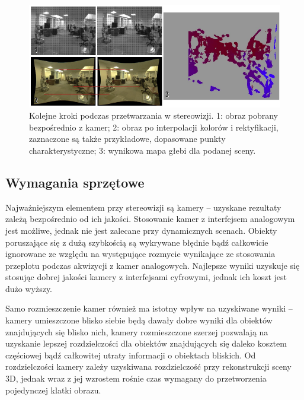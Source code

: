 \begin{figure}[h!]
\centering
\includegraphics{../../Common/img/stereo_steps} 
\caption[Kolejne kroki podczas przetwarzania w stereowizji]
{Kolejne kroki podczas przetwarzania w stereowizji. 1: obraz pobrany
bezpośrednio z kamer; 2: obraz po interpolacji kolorów i rektyfikacji,
zaznaczone są także przykładowe, dopasowane punkty charakterystyczne; 3:
wynikowa mapa głebi dla podanej sceny.}
\label{fig:stereo_steps}
\end{figure}

\subsection{Wymagania sprzętowe}

Najważniejszym elementem przy stereowizji są kamery -- uzyskane rezultaty zależą
bezpośrednio od ich jakości. Stosowanie kamer z interfejsem analogowym jest
możliwe, jednak nie jest zalecane przy dynamicznych scenach. Obiekty
poruszające się z dużą szybkością są wykrywane błędnie bądź całkowicie
ignorowane ze względu na występujące rozmycie wynikające ze stosowania
przeplotu podczas akwizycji z kamer analogowych. Najlepsze wyniki uzyskuje się
stosując dobrej jakości kamery z interfejsami cyfrowymi, jednak ich koszt jest
dużo wyższy.

Samo rozmieszczenie kamer również ma istotny wpływ na uzyskiwane wyniki --
kamery umieszczone blisko siebie będą dawały dobre wyniki dla obiektów
znajdujących się blisko nich, kamery rozmieszczone szerzej pozwalają na
uzyskanie lepszej rozdzielczości dla obiektów znajdujących się daleko kosztem
częściowej bądź całkowitej utraty informacji o obiektach bliskich. Od
rozdzielczości kamery zależy uzyskiwana rozdzielczość przy rekonstrukcji sceny
3D, jednak wraz z jej wzrostem rośnie czas wymagany do przetworzenia
pojedynczej klatki obrazu.

